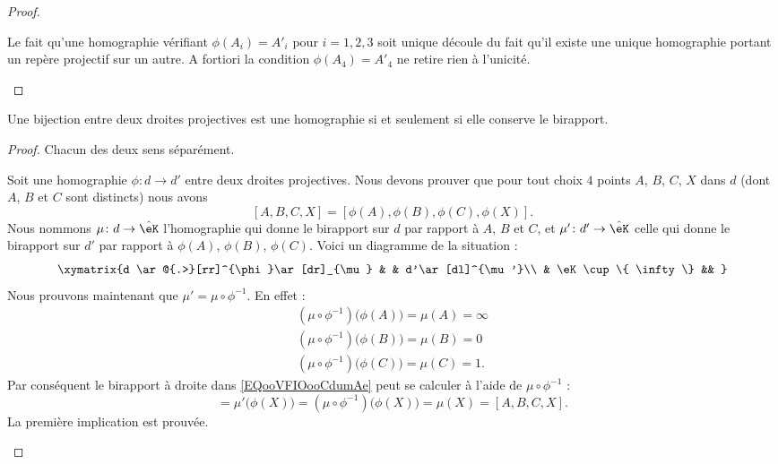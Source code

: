 \begin{proof}
\begin{subproof}
		\spitem[Unicité]

		Le fait qu'une homographie vérifiant \( \phi(A_i)=A'_i\) pour \( i=1,2,3\) soit unique découle du fait qu'il existe une unique homographie portant un repère projectif sur un autre. A fortiori la condition \( \phi(A_4)=A'_4\) ne retire rien à l'unicité.

	\end{subproof}
\end{proof}

\begin{theorem}
	Une bijection entre deux droites projectives est une homographie si et seulement si elle conserve le birapport.
\end{theorem}

\begin{proof}
	Chacun des deux sens séparément.
	\begin{subproof}
		\spitem[\( \Rightarrow\)]

		Soit une homographie \( \phi\colon d\to d'\) entre deux droites projectives. Nous devons prouver que pour tout choix \( 4\) points \( A\), \( B\), \( C\), \( X\) dans \( d\) (dont \( A\), \( B\) et \( C\) sont distincts) nous avons
		\begin{equation}        \label{EQooVFIOooCdumAe}
			[A,B,C,X]=[\phi(A),\phi(B),\phi(C),\phi(X)].
		\end{equation}
		Nous nommons \( \mu\colon d\to \hat\eK\) l'homographie qui donne le birapport sur \( d\) par rapport à \( A\), \( B\) et \( C\), et \( \mu'\colon d'\to \hat\eK\) celle qui donne le birapport sur \( d'\) par rapport à \( \phi(A)\), \( \phi(B)\), \( \phi(C)\). Voici un diagramme de la situation :
		\begin{equation}
			\xymatrix{%
				d \ar@{.>}[rr]^{\phi}\ar[dr]_{\mu}  &    &   d'\ar[dl]^{\mu'}\\
				&  \eK\cup\{ \infty \} &&
			}
		\end{equation}
		Nous prouvons maintenant que \( \mu'=\mu\circ\phi^{-1}\). En effet :
		\begin{subequations}
			\begin{align}
				(\mu\circ\phi^{-1})\big( \phi(A) \big)=\mu(A)=\infty \\
				(\mu\circ\phi^{-1})\big( \phi(B) \big)=\mu(B)=0      \\
				(\mu\circ\phi^{-1})\big( \phi(C) \big)=\mu(C)=1.
			\end{align}
		\end{subequations}
		Par conséquent le birapport à droite dans \eqref{EQooVFIOooCdumAe} peut se calculer à l'aide de \( \mu\circ\phi^{-1}\) :
		\begin{equation}
			[\phi(A),\phi(B),\phi(C),\phi(X)]=\mu'\big( \phi(X) \big)=(\mu\circ\phi^{-1})\big( \phi(X) \big)=\mu(X)=[A,B,C,X].
		\end{equation}
		La première implication est prouvée.


\end{subproof}
\end{proof}
